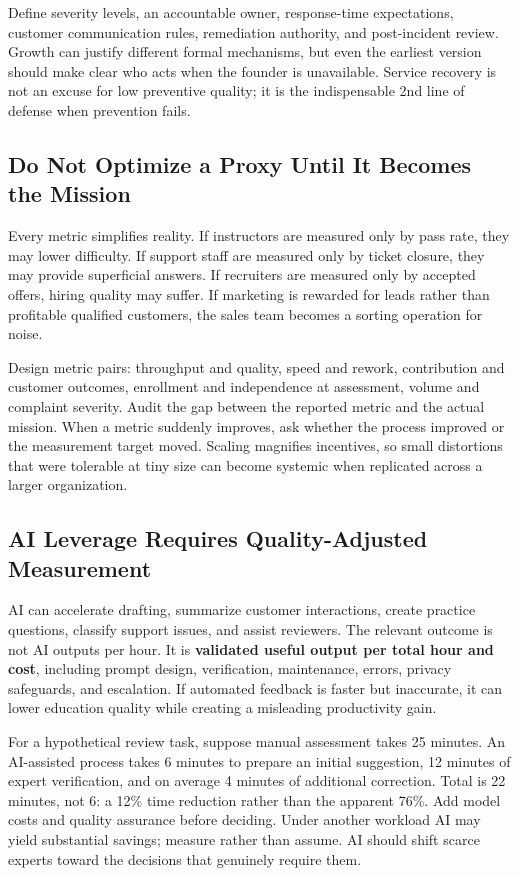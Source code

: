 Define severity levels, an accountable owner, response-time expectations, customer communication rules, remediation authority, and post-incident review. Growth can justify different formal mechanisms, but even the earliest version should make clear who acts when the founder is unavailable. Service recovery is not an excuse for low preventive quality; it is the indispensable 2nd line of defense when prevention fails.

\subsection{Do Not Optimize a Proxy Until It Becomes the Mission}
\label{sec:do_not_optimize_proxy}

Every metric simplifies reality. If instructors are measured only by pass rate, they may lower difficulty. If support staff are measured only by ticket closure, they may provide superficial answers. If recruiters are measured only by accepted offers, hiring quality may suffer. If marketing is rewarded for leads rather than profitable qualified customers, the sales team becomes a sorting operation for noise.

Design metric pairs: throughput and quality, speed and rework, contribution and customer outcomes, enrollment and independence at assessment, volume and complaint severity. Audit the gap between the reported metric and the actual mission. When a metric suddenly improves, ask whether the process improved or the measurement target moved. Scaling magnifies incentives, so small distortions that were tolerable at tiny size can become systemic when replicated across a larger organization.

\subsection{AI Leverage Requires Quality-Adjusted Measurement}
\label{sec:ai_leverage_quality_adjusted}

AI can accelerate drafting, summarize customer interactions, create practice questions, classify support issues, and assist reviewers. The relevant outcome is not AI outputs per hour. It is \textbf{validated useful output per total hour and cost}, including prompt design, verification, maintenance, errors, privacy safeguards, and escalation. If automated feedback is faster but inaccurate, it can lower education quality while creating a misleading productivity gain.

For a hypothetical review task, suppose manual assessment takes 25 minutes. An AI-assisted process takes 6 minutes to prepare an initial suggestion, 12 minutes of expert verification, and on average 4 minutes of additional correction. Total is 22 minutes, not 6: a 12\% time reduction rather than the apparent 76\%. Add model costs and quality assurance before deciding. Under another workload AI may yield substantial savings; measure rather than assume. AI should shift scarce experts toward the decisions that genuinely require them.

